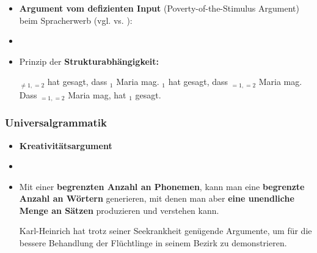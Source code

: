 \begin{frame}

\begin{itemize}
	\item \textbf{Argument vom defizienten Input} (Poverty-of-the-Stimulus Argument) beim Spracherwerb (vgl. \citealt{Lasnik&Co02a} vs. \citealt{Pullum&Scholz02a}):
	\item[]
	\item Prinzip der \textbf{Strukturabhängigkeit:}
	\eal 
\pause
\pause
\pause	
\pause
	\zl

\pause	

	\eal 
	\ex {}$_{\neq 1, =2}$ hat gesagt, dass $_1$ Maria mag.
\pause	
	\ex {}$_1$ hat gesagt, dass $_{=1, =2}$ Maria mag.
\pause	
	\ex Dass $_{=1, =2}$ Maria mag, hat $_1$ gesagt.
	\zl
	
	
\end{itemize}

\end{frame}


\begin{frame}
\frametitle{Universalgrammatik}

\begin{itemize}
	\item \textbf{Kreativitätsargument}
	\item[]
	\item Mit einer \textbf{begrenzten Anzahl an Phonemen}, kann man eine \textbf{begrenzte Anzahl an Wörtern} generieren, mit denen man aber \textbf{eine unendliche Menge an Sätzen} produzieren und verstehen kann.

\pause	
	\ea Karl-Heinrich hat trotz seiner Seekrankheit genügende Argumente, um für die bessere Behandlung der Flüchtlinge in seinem Bezirk zu demonstrieren.
	\z

\end{itemize}

\end{frame}


